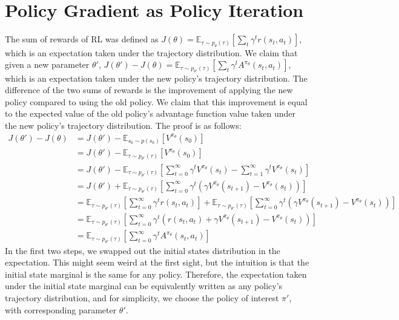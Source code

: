 \section{Policy Gradient as Policy Iteration}
The sum of rewards of RL was defined as $J(\theta) = \mathbb{E}_{\tau\sim p_\theta(\tau)}\left[\sum_t\gamma^tr(s_t,a_t)\right]$, which is an expectation taken under the trajectory distribution. We claim that given a new parameter $\theta'$, $J(\theta') - J(\theta) = \mathbb{E}_{\tau\sim p_{\theta'}(\tau)}\left[\sum_t\gamma^tA^{\pi_\theta}(s_t,a_t)\right]$, which is an expectation taken under the new policy's trajectory distribution. The difference of the two sums of rewards is the improvement of applying the new policy compared to using the old policy. We claim that this improvement is equal to the expected value of the old policy's advantage function value taken under the new policy's trajectory distribution. The proof is as follows:
\begin{align*}
    J(\theta') - J(\theta) &= J(\theta') - \mathbb{E}_{s_0\sim p(s_0)}\left[V^{\pi_\theta}(s_0)\right]\\
    &= J(\theta') - \mathbb{E}_{\tau\sim p_{\theta'}(\tau)}\left[V^{\pi_\theta}(s_0)\right]\\
    &= J(\theta') - \mathbb{E}_{\tau\sim p_{\theta'}(\tau)}\left[\sum_{t=0}^\infty\gamma^t V^{\pi_\theta}(s_t) - \sum_{t=1}^\infty\gamma^tV^{\pi_\theta}(s_t)\right]\\
    &= J(\theta') + \mathbb{E}_{\tau\sim p_{\theta'}(\tau)}\left[\sum_{t=0}^\infty\gamma^t\left(\gamma V^{\pi_\theta}(s_{t+1}) - V^{\pi_\theta}(s_t)\right)\right]\\
    &= \mathbb{E}_{\tau\sim p_{\theta'}(\tau)}\left[\sum_{t=0}^\infty\gamma^tr(s_t,a_t)\right] + \mathbb{E}_{\tau\sim p_{\theta'}(\tau)}\left[\sum_{t=0}^\infty\gamma^t\left(\gamma V^{\pi_\theta}(s_{t+1}) - V^{\pi_\theta}(s_t)\right)\right]\\
    &= \mathbb{E}_{\tau\sim p_{\theta'}(\tau)}\left[\sum_{t=0}^\infty\gamma^t\left(r(s_t,a_t) + \gamma V^{\pi_\theta}(s_{t+1})-V^{\pi_\theta}(s_t)\right)\right]\\
    &= \mathbb{E}_{\tau\sim p_{\theta'}(\tau)}\left[\sum_{t=0}^\infty\gamma^tA^{\pi_\theta}(s_t,a_t)\right]
\end{align*}
In the first two steps, we swapped out the initial states distribution in the expectation. This might seem weird at the first sight, but the intuition is that the initial state marginal is the same for any policy. Therefore, the expectation taken under the initial state marginal can be equivalently written as any policy's trajectory distribution, and for simplicity, we choose the policy of interest $\pi'$, with corresponding parameter $\theta'$.

